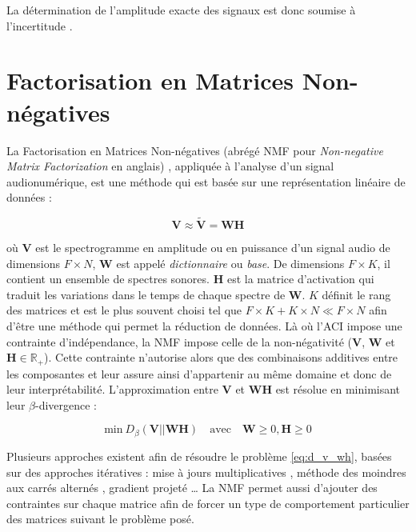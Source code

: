 La détermination de l'amplitude exacte des signaux est donc soumise à l'incertitude \cite{naik2011overview}.

\section{Factorisation en Matrices Non-négatives}

La Factorisation en Matrices Non-négatives (abrégé NMF pour \textit{Non-negative Matrix Factorization} en anglais) \cite{lee_learning_1999}, appliquée à l'analyse d'un signal audionumérique, est une méthode qui est basée sur une représentation linéaire de données :

\begin{equation}
\mathbf{V} \approx \mathbf{\tilde{V}} = \mathbf{WH}
\end{equation}

où $\mathbf{V}$ est le spectrogramme en amplitude ou en puissance d'un signal audio de dimensions $F \times N$, $\mathbf{W}$ est appelé \textit{dictionnaire} ou \textit{base}. De dimensions $F \times K$, il contient un ensemble de spectres sonores. $\mathbf{H}$ est la matrice d'activation qui traduit les variations dans le temps de chaque spectre de $\mathbf{W}$.  $K$ définit le rang des matrices et est le plus souvent choisi tel que $F\times K + K \times N \ll F \times N$ afin d'être une méthode qui permet la réduction de données.
Là où l'ACI impose une contrainte d'indépendance, la NMF impose celle de la \og non-négativité \fg{} ($\mathbf{V}$, $\mathbf{W}$ et $\mathbf{H} \in \mathbb{R}_+$). Cette contrainte n'autorise alors que des combinaisons additives entre les composantes et leur assure ainsi d'appartenir au même domaine et donc de leur interprétabilité.
L'approximation entre $\mathbf{V}$ et $\mathbf{WH}$ est résolue en minimisant leur $\beta$-divergence :

\begin{equation}\label{eq:d_v_wh}
\text{min}~D_{\beta}\left(\textbf{V} \vert\vert \textbf{WH}\right) \quad \text{avec} \quad \mathbf{W} \geq 0, \mathbf{H} \geq 0
\end{equation}

Plusieurs approches existent afin de résoudre le problème \ref{eq:d_v_wh}, basées sur des approches itératives : mise à jours multiplicatives \cite{lee_algorithms_2000}, méthode des moindres aux carrés alternés \cite{cichocki_regularized_2007}, gradient projeté \cite{lin_projected_2007} \dots{} La NMF permet aussi d'ajouter des contraintes sur chaque matrice \cite{virtanen_monaural_2007} afin de forcer un type de comportement particulier des matrices suivant le problème posé.


